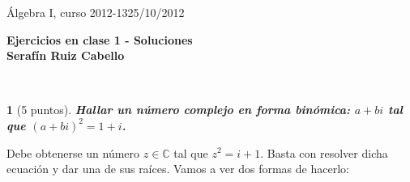 \documentclass[12pt,a4paper]{report}
\newtheorem{ex}{}
\begin{document}
\noindent
{\sffamily\large  
\'Algebra I, curso 2012-13\hfill     25/10/2012}
 

\begin{center}\bfseries\large\textsf{Ejercicios en clase 1 - Soluciones \\
Seraf\'in Ruiz Cabello\vspace{-2mm}}
\end{center}


\hrulefill{}\\ 
\begin{ex}[5 puntos]   
{\bf Hallar un n\'umero complejo en forma bin\'omica: $a + bi$ tal que $(a + bi)^2 = 1 + i$.}
\end{ex}  

Debe obtenerse un n\'umero $z\in\mathbb{C}$ tal que $z^2 = i+1$. Basta con resolver dicha ecuaci\'on y dar una de sus ra\'ices. Vamos a ver dos formas de hacerlo:
\end{document}
